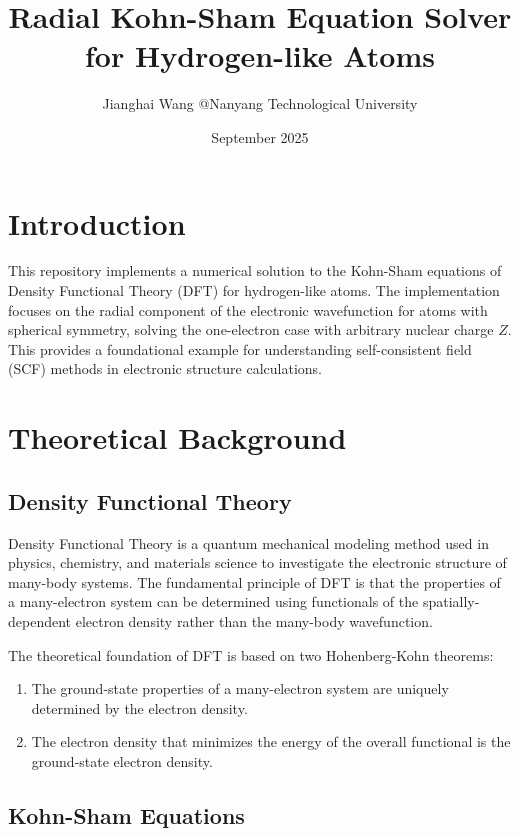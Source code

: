 \documentclass[12pt,a4paper]{article}
\title{Radial Kohn-Sham Equation Solver for Hydrogen-like Atoms}
\author{Jianghai Wang @Nanyang Technological University}
\date{September 2025}
\begin{document}
\maketitle

\section{Introduction}

This repository implements a numerical solution to the Kohn-Sham equations of Density Functional Theory (DFT) for hydrogen-like atoms. The implementation focuses on the radial component of the electronic wavefunction for atoms with spherical symmetry, solving the one-electron case with arbitrary nuclear charge $Z$. This provides a foundational example for understanding self-consistent field (SCF) methods in electronic structure calculations.

\section{Theoretical Background}

\subsection{Density Functional Theory}

Density Functional Theory is a quantum mechanical modeling method used in physics, chemistry, and materials science to investigate the electronic structure of many-body systems. The fundamental principle of DFT is that the properties of a many-electron system can be determined using functionals of the spatially-dependent electron density rather than the many-body wavefunction.

The theoretical foundation of DFT is based on two Hohenberg-Kohn theorems:

\begin{enumerate}
    \item The ground-state properties of a many-electron system are uniquely determined by the electron density.
    \item The electron density that minimizes the energy of the overall functional is the ground-state electron density.
\end{enumerate}

\subsection{Kohn-Sham Equations}
\end{document}
